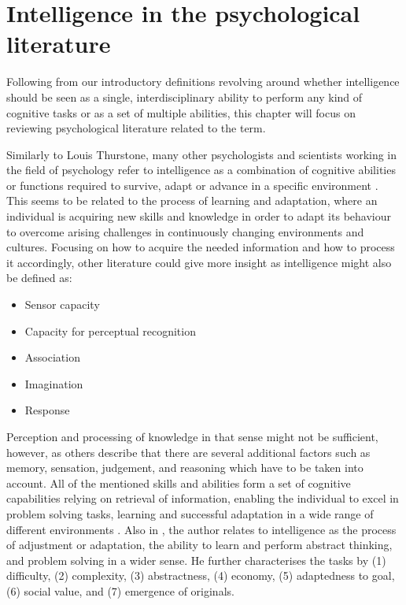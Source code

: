 \documentclass[conference]{IEEEtran}
\begin{document}
\section{Intelligence in the psychological literature}

	Following from our introductory definitions revolving around whether intelligence should be seen as a single, interdisciplinary ability to perform any kind of cognitive tasks or as a set of multiple abilities, this chapter will focus on reviewing psychological literature related to the term.

	Similarly to Louis Thurstone, many other psychologists and scientists working in the field of psychology refer to intelligence as a combination of cognitive abilities or functions required to survive, adapt or advance in a specific environment \cite{b1}. This seems to be related to the process of learning and adaptation, where an individual is acquiring new skills and knowledge in order to adapt its behaviour to overcome arising challenges in continuously changing environments and cultures. Focusing on how to acquire the needed information and how to process it accordingly, other literature could give more insight as intelligence might also be defined as:

	\begin{itemize}
		\item Sensor capacity
		\item Capacity for perceptual recognition
		\item Association
		\item Imagination
		\item Response \cite{b2}
	\end{itemize}

	Perception and processing of knowledge in that sense might not be sufficient, however, as others describe that there are several additional factors such as memory, sensation, judgement, and reasoning which have to be taken into account. All of the mentioned skills and abilities form a set of cognitive capabilities relying on retrieval of information, enabling the individual to excel in problem solving tasks, learning and successful adaptation in a wide range of different environments \cite{b3}. Also in \cite{b4}, the author relates to intelligence as the process of adjustment or adaptation, the ability to learn and perform abstract thinking, and problem solving in a wider sense. He further characterises the tasks by (1) difficulty, (2) complexity, (3) abstractness, (4) economy, (5) adaptedness to goal, (6) social value, and (7) emergence of originals.
\end{document}
